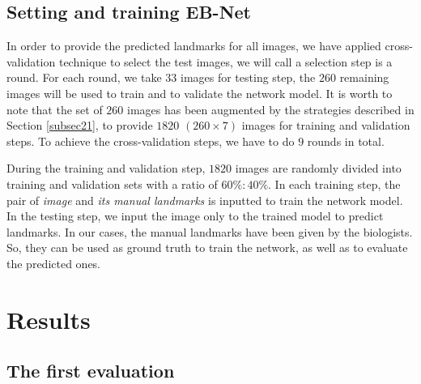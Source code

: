 \documentclass[review]{elsarticle}
\begin{document}
\subsection{Setting and training EB-Net}
\label{subsec23}
In order to provide the predicted landmarks for all images, we have applied cross-validation technique to select the test images, we will call a selection step is a round. For each round, we take $33$ images for testing step, the $260$ remaining images will be used to train and to validate the network model. It is worth to note that the set of $260$ images has been augmented by the strategies described in Section \ref{subsec21}, to provide $1820$ $(260 \times 7)$ images for training and validation steps. To achieve the cross-validation steps, we have to do $9$ rounds in total. 

During the training and validation step, $1820$ images are randomly divided into training and validation sets with a ratio of $60\%:40\%$. In each training step, the pair of \textit{image} and \textit{its manual landmarks} is inputted to train the network model. In the testing step, we input the image only to the trained model to predict landmarks. In our cases, the manual landmarks have been given by the biologists. So, they can be used as ground truth to train the network, as well as to evaluate the predicted ones. 

\section{Results}
\label{sec3}
\subsection{The first evaluation}
\label{subsec31}

\end{document}
